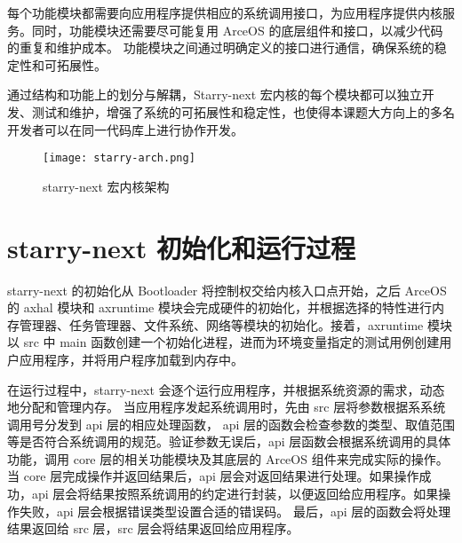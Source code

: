 每个功能模块都需要向应用程序提供相应的系统调用接口，为应用程序提供内核服务。同时，功能模块还需要尽可能复用 ArceOS 的底层组件和接口，以减少代码的重复和维护成本。
功能模块之间通过明确定义的接口进行通信，确保系统的稳定性和可拓展性。

通过结构和功能上的划分与解耦，Starry-next 宏内核的每个模块都可以独立开发、测试和维护，增强了系统的可拓展性和稳定性，也使得本课题大方向上的多名开发者可以在同一代码库上进行协作开发。

\begin{figure}[H]
    \centering
    \texttt{[image: starry-arch.png]}
    \caption{starry-next 宏内核架构}
    \label{fig:starry-next}
\end{figure}

\section{starry-next 初始化和运行过程}


starry-next 的初始化从 Bootloader 将控制权交给内核入口点开始，之后 ArceOS 的 axhal 模块和 axruntime 模块会完成硬件的初始化，并根据选择的特性进行内存管理器、任务管理器、文件系统、网络等模块的初始化。接着，axruntime 模块以 src 中 main 函数创建一个初始化进程，进而为环境变量指定的测试用例创建用户应用程序，并将用户程序加载到内存中。


在运行过程中，starry-next 会逐个运行应用程序，并根据系统资源的需求，动态地分配和管理内存。
当应用程序发起系统调用时，先由 src 层将参数根据系系统调用号分发到 api 层的相应处理函数，
api 层的函数会检查参数的类型、取值范围等是否符合系统调用的规范。验证参数无误后，api 层函数会根据系统调用的具体功能，调用 core 层的相关功能模块及其底层的 ArceOS 组件来完成实际的操作。
当 core 层完成操作并返回结果后，api 层会对返回结果进行处理。如果操作成功，api 层会将结果按照系统调用的约定进行封装，以便返回给应用程序。如果操作失败，api 层会根据错误类型设置合适的错误码。
最后，api 层的函数会将处理结果返回给 src 层，src 层会将结果返回给应用程序。

